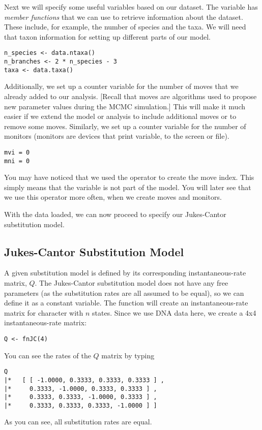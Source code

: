 Next we will specify some useful variables based on our dataset. The variable  has \emph{member functions} that we can use to retrieve information about the dataset. 
These include, for example, the number of species and the taxa.
We will need that taxon information for setting up different parts of our model.
{\tt \begin{snugshade*}
\begin{lstlisting}
n_species <- data.ntaxa()
n_branches <- 2 * n_species - 3
taxa <- data.taxa()
\end{lstlisting}
\end{snugshade*}}

Additionally, we set up a counter variable for the number of moves that we already added to our analysis.
[Recall that moves are algorithms used to propose new parameter values during the MCMC simulation.]
This will make it much easier if we extend the model or analysis to include additional moves or to remove some moves.
Similarly, we set up a counter variable for the number of monitors (monitors are devices that print variable, \EG to the screen or file).
{\tt \begin{snugshade*}
\begin{lstlisting}
mvi = 0 
mni = 0
\end{lstlisting}
\end{snugshade*}}
You may have noticed that we used the \cl{=} operator to create the move index.
This simply means that the variable is not part of the model.
You will later see that we use this operator more often, \EG when we create moves and monitors.

With the data loaded, we can now proceed to specify our Jukes-Cantor substitution model.

\subsection{Jukes-Cantor Substitution Model}

A given substitution model is defined by its corresponding instantaneous-rate matrix, $Q$.
The Jukes-Cantor substitution model does not have any free parameters (as the substitution rates are all assumed to be equal), so we can define it as a constant variable.
The function  will create an instantaneous-rate matrix for character with $n$ states.
Since we use DNA data here, we create a 4x4 instantaneous-rate matrix:
{\tt \begin{snugshade*}
\begin{lstlisting}
Q <- fnJC(4) 
\end{lstlisting}
\end{snugshade*}}
You can see the rates of the $Q$ matrix by typing
{\tt \begin{snugshade*}
\begin{lstlisting}
Q
|*   [ [ -1.0000, 0.3333, 0.3333, 0.3333 ] ,
|*     0.3333, -1.0000, 0.3333, 0.3333 ] ,
|*     0.3333, 0.3333, -1.0000, 0.3333 ] ,
|*     0.3333, 0.3333, 0.3333, -1.0000 ] ]
\end{lstlisting}
\end{snugshade*}}
As you can see, all substitution rates are equal.


